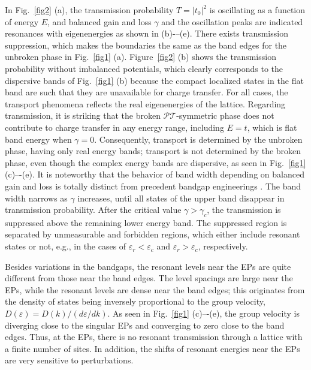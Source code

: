 \documentclass[report,epsfig,pre]{revtex4}
\begin{document}
In Fig.~\ref{fig2} (a), the transmission probability $T=\left|t_0\right|^2$ is oscillating as a function of energy $E$, and balanced gain and loss $\gamma$ and the oscillation peaks are indicated resonances with eigenenergies as shown in (b)-–(e). There exists transmission suppression, which makes the boundaries the same as the band edges for the unbroken phase in Fig.~\ref{fig1} (a). Figure~\ref{fig2} (b) shows the transmission probability without imbalanced potentials, which clearly corresponds to the dispersive bands of Fig.~\ref{fig1} (b) because the compact localized states in the flat band are such that they are unavailable for charge transfer. For all cases, the transport phenomena reflects the real eigenenergies of the lattice.
Regarding transmission, it is striking that the broken $\mathcal{PT}$-symmetric phase does not contribute to charge transfer in any energy range, including $E = t$, which is flat band energy when $\gamma = 0$. Consequently, transport is determined by the unbroken phase, having only real energy bands; transport is not determined by the broken phase, even though the complex energy bands are dispersive, as seen in Fig.~\ref{fig1} (c)–-(e). 
It is noteworthy that the behavior of band width depending on balanced gain and loss is totally distinct from precedent bandgap engineerings \cite{Cap87}. The band width narrows as $\gamma$ increases, until all states of the upper band disappear in transmission probability.
After the critical value $\gamma>\gamma_c$, the transmission is suppressed above the remaining lower energy band. The suppressed region is separated by unmeasurable and forbidden regions, which either include resonant states or not, e.g., in the cases of $\varepsilon_{r} < \varepsilon_c$ and $\varepsilon_{r} > \varepsilon_c$, respectively. 

Besides variations in the bandgaps, the resonant levels near the EPs are quite different from those near the band edges. The level spacings are large near the EPs, while the resonant levels are dense near the band edges; this originates from the density of states being inversely proportional to the group velocity, $D(\varepsilon)=D(k)/(d\varepsilon/dk)$. As seen in Fig.~\ref{fig1} (c)–-(e), the group velocity is diverging close to the singular EPs and converging to zero close to the band edges.
Thus, at the EPs, there is no resonant transmission through a lattice with a finite number of sites. In addition, the shifts of resonant energies near the EPs are very sensitive to perturbations.

\end{document}
